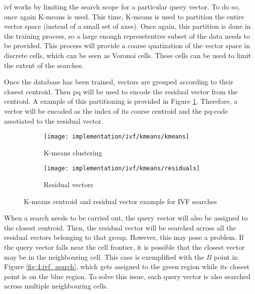 \documentclass[../main.tex]{subfiles}
\begin{document}
\Gls{ivf} works by limiting the search scope for a particular query vector. To do so, once again K-means is used. This time, K-means is used to partition the entire vector space (instead of a small set of axes). Once again, this partition is done in the training process, so a large enough represetentive subset of the data needs to be provided. This process will provide a coarse quatization of the vector space in discrete cells, which can be seen as Voronoi cells\cite{chang2022b}. These cells can be used to limit the extent of the searches.

Once the database has been trained, vectors are grouped according to their closest centroid. Then \gls{pq} will be used to encode the residual vector from the centroid. A example of this partitioning is provided in Figure \ref{fig:4:ivf_kmeans}. Therefore, a vector will be encoded as the index of its coarse centroid and the \gls{pq}-code assotiated to the residual vector\cite{chang2022b}.

\begin{figure}[htbp]
    \centering
    \begin{subfigure}[b]{.45\textwidth}
         \centering
         \texttt{[image: implementation/ivf/kmeans/kmeans]}
         \caption{K-means clustering}
    \end{subfigure}
    \hfill
    \begin{subfigure}[b]{.45\textwidth}
         \centering
         \texttt{[image: implementation/ivf/kmeans/residuals]}
         \caption{Residual vectors}
    \end{subfigure}
    \caption{K-means centroid and residual vector example for IVF searches}
    \label{fig:4:ivf_kmeans}
\end{figure}

When a search needs to be carried out, the query vector will also be assigned to the closest centroid. Then, the residual vector will be searched across all the residual vectors belonging to that group. However, this may pose a problem. If the query vector falls near the cell frontier, it is possible that the closest vector may be in the neighbouring cell. This case is exemplified with the $B$ point in Figure \ref{fig:4:ivf_search}, which gets assigned to the green region while its closest point is on the blue region. To solve this issue, each query vector is also searched across multiple neighbouring cells\cite{chang2022b}. 
\end{document}
